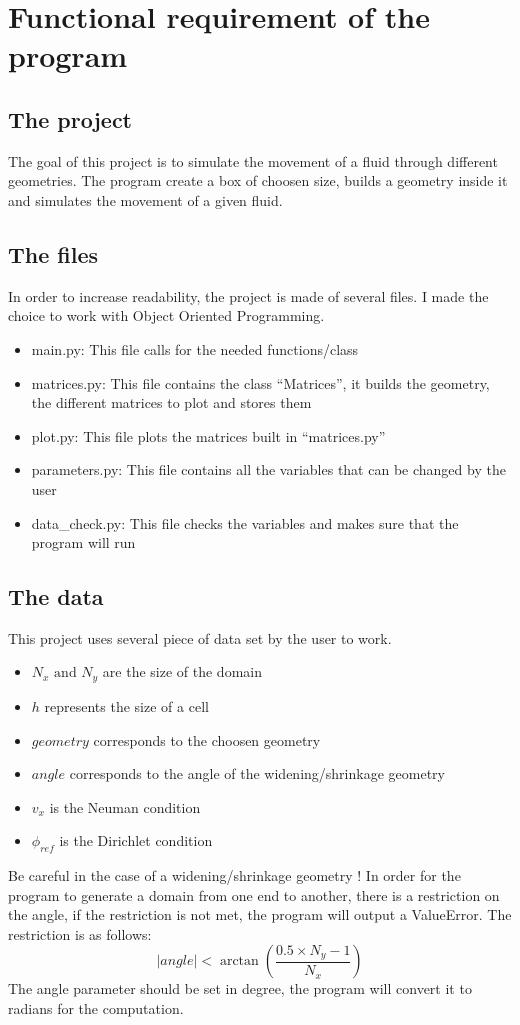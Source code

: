 \section{Functional requirement of the program}
\subsection{The project}
The goal of this project is to simulate the movement of a fluid through
different geometries. The program create a box of choosen size, builds a
geometry inside it and simulates the movement of a given fluid.

\subsection{The files}
In order to increase readability, the project is made of several files.
I made the choice to work with Object Oriented Programming.
\begin{itemize}
    \item main.py: This file calls for the needed functions/class
    \item matrices.py: This file contains the class ``Matrices'', it builds the
          geometry, the different matrices to plot and stores them
    \item plot.py: This file plots the matrices built in ``matrices.py''
    \item parameters.py: This file contains all the variables that can be 
          changed by the user
    \item data\_check.py: This file checks the variables and makes sure that
          the program will run
\end{itemize}

\subsection{The data}
This project uses several piece of data set by the user to work.
\begin{itemize}
    \item $N_x \text{ and } N_y$ are the size of the domain
    \item $h$ represents the size of a cell
    \item $geometry$ corresponds to the choosen geometry
    \item $angle$ corresponds to the angle of the widening/shrinkage geometry
    \item $v_x$ is the Neuman condition
    \item $\phi_{ref}$ is the Dirichlet condition
\end{itemize}
Be careful in the case of a widening/shrinkage geometry !
In order for the program to generate a domain from one end to another, there is
a restriction on the angle, if the restriction is not met, the program will
output a ValueError. The restriction is as follows:
\[
      |angle| < \arctan{\left(\dfrac{0.5 \times N_y - 1}{N_x}\right)}
\]
The angle parameter should be set in degree, the program will convert it to
radians for the computation.

